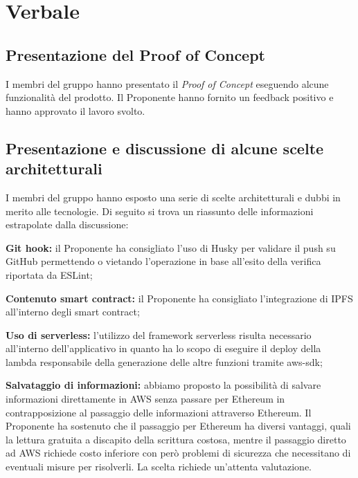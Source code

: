 \section{Verbale}
\subsection{Presentazione del Proof of Concept}
I membri del gruppo hanno presentato il \textit{Proof of Concept} eseguendo alcune funzionalità del prodotto. Il Proponente hanno fornito un feedback positivo e hanno approvato il lavoro svolto.


\subsection{Presentazione e discussione di alcune scelte architetturali}
I membri del gruppo hanno esposto una serie di scelte architetturali e dubbi in merito alle tecnologie.
Di seguito si trova un riassunto delle informazioni estrapolate dalla discussione:
\begin{description}
	\item{\textbf{Git hook:}} il Proponente ha consigliato l'uso di Husky per validare il push su GitHub permettendo o vietando l'operazione in base all'esito della verifica riportata da ESLint;
		\item{\textbf{Contenuto smart contract:}} il Proponente ha consigliato l'integrazione di IPFS all'interno degli smart contract;
		\item{\textbf{Uso di serverless:}} l'utilizzo del framework serverless risulta necessario all'interno dell'applicativo in quanto ha lo scopo di eseguire il deploy della lambda responsabile della generazione delle altre funzioni tramite aws-sdk;
		\item{\textbf{Salvataggio di informazioni:}} abbiamo proposto la possibilità di salvare informazioni direttamente in AWS senza passare per Ethereum in contrapposizione al passaggio delle informazioni attraverso Ethereum. Il Proponente ha sostenuto che il passaggio per Ethereum ha diversi vantaggi, quali la lettura gratuita a discapito della scrittura costosa, mentre il passaggio diretto ad AWS richiede costo inferiore con però problemi di sicurezza che necessitano di eventuali misure per risolverli. La scelta richiede un'attenta valutazione.
\end{description}
